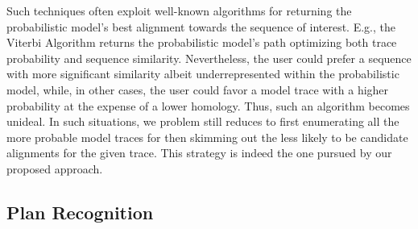 Such techniques often exploit well-known algorithms for returning the probabilistic model's best alignment towards the sequence of interest. E.g., the Viterbi Algorithm \cite{Viterbi67} returns the probabilistic model's path optimizing both trace probability and sequence similarity.  Nevertheless, the user could prefer a sequence with more significant similarity albeit underrepresented within the probabilistic model, while, in other cases, the user could favor a model trace with a higher probability at the expense of a lower homology. Thus, such an algorithm becomes unideal. In such situations, we problem still reduces to first enumerating all the more probable model traces for then skimming out the less likely to be candidate alignments for the given trace. This strategy is indeed the one pursued by our proposed approach. 


\subsection{Plan Recognition}